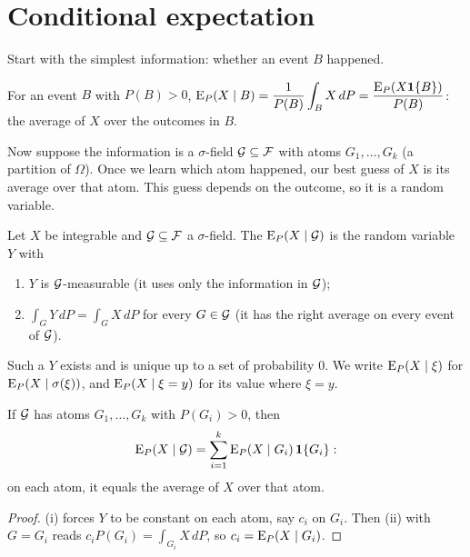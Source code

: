 \section{Conditional expectation}

Start with the simplest information: whether an event $B$ happened.

\begin{definition}
For an event $B$ with $P(B)>0$, $\operatorname{E}_P(X\mid B)=\dfrac{1}{P(B)}\displaystyle\int_BX\,dP=\dfrac{\operatorname{E}_P(X\mathbf{1}\{B\})}{P(B)}$: the average of $X$ over the outcomes in $B$.
\end{definition}

Now suppose the information is a $\sigma$-field $\mathcal G\subseteq\mathcal F$ with atoms $G_1,\dots,G_k$ (a partition of $\Omega$). Once we learn which atom happened, our best guess of $X$ is its average over that atom. This guess depends on the outcome, so it is a random variable.

\begin{definition}
\label{def:cond-exp}
Let $X$ be integrable and $\mathcal G\subseteq\mathcal F$ a $\sigma$-field. The  $\operatorname{E}_P(X\mid\mathcal G)$ is the random variable $Y$ with
\begin{enumerate}[label=(\roman*)]
  \item $Y$ is $\mathcal G$-measurable (it uses only the information in $\mathcal G$);
  \item $\int_GY\,dP=\int_GX\,dP$ for every $G\in\mathcal G$ (it has the right average on every event of $\mathcal G$).
\end{enumerate}
Such a $Y$ exists and is unique up to a set of probability $0$. We write $\operatorname{E}_P(X\mid\xi)$ for $\operatorname{E}_P(X\mid\sigma(\xi))$, and $\operatorname{E}_P(X\mid\xi=y)$ for its value where $\xi=y$.
\end{definition}

\begin{result}
\label{res:partition}
If $\mathcal G$ has atoms $G_1,\dots,G_k$ with $P(G_i)>0$, then
\[
  \operatorname{E}_P(X\mid\mathcal G)=\sum_{i=1}^k\operatorname{E}_P(X\mid G_i)\,\mathbf{1}\{G_i\}:
\]
on each atom, it equals the average of $X$ over that atom.
\end{result}
\begin{proof}
(i) forces $Y$ to be constant on each atom, say $c_i$ on $G_i$. Then (ii) with $G=G_i$ reads $c_iP(G_i)=\int_{G_i}X\,dP$, so $c_i=\operatorname{E}_P(X\mid G_i)$.
\end{proof}

